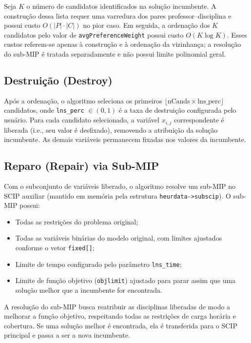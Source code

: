 Seja $K$ o número de candidatos identificados na solução incumbente. A construção dessa lista requer uma varredura dos pares professor--disciplina e possui custo $O(|P|\cdot|C|)$ no pior caso. Em seguida, a ordenação dos $K$ candidatos pelo valor de \texttt{avgPreferenceWeight} possui custo $O(K\log K)$. Esses custos referem-se apenas à construção e à ordenação da vizinhança; a resolução do sub-MIP é tratada separadamente e não possui limite polinomial geral.

\subsection{Destruição (Destroy)}

Após a ordenação, o algoritmo seleciona os primeiros $\lfloor \text{nCands} \times \text{lns\_perc} \rfloor$ candidatos, onde \texttt{lns\_perc} $\in (0,1)$ é a taxa de destruição configurada pelo usuário. Para cada candidato selecionado, a variável $x_{i,j}$ correspondente é liberada (i.e., seu valor é desfixado), removendo a atribuição da solução incumbente. As demais variáveis permanecem fixadas nos valores da incumbente.

\subsection{Reparo (Repair) via Sub-MIP}

Com o subconjunto de variáveis liberado, o algoritmo resolve um sub-MIP no SCIP auxiliar (mantido em memória pela estrutura \texttt{heurdata->subscip}). O sub-MIP possui:
\begin{itemize}
  \item Todas as restrições do problema original;
  \item Todas as variáveis binárias do modelo original, com limites ajustados conforme o vetor \texttt{fixed[]};
  \item Limite de tempo configurado pelo parâmetro \texttt{lns\_time};
  \item Limite de função objetivo (\texttt{objlimit}) ajustado para parar assim que uma solução melhor que a incumbente for encontrada.
\end{itemize}

A resolução do sub-MIP busca reatribuir as disciplinas liberadas de modo a melhorar a função objetivo, respeitando todas as restrições de carga horária e cobertura. Se uma solução melhor é encontrada, ela é transferida para o SCIP principal e passa a ser a nova incumbente.

